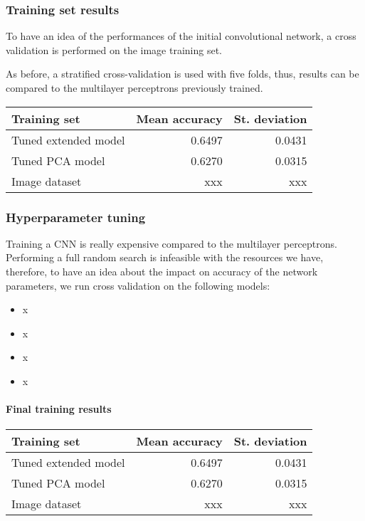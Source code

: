 \subsubsection{Training set results}
To have an idea of the performances of the initial convolutional network,
a cross validation is performed on the image training set. 

As before, a stratified cross-validation is used with five folds, thus, 
results can be compared to the multilayer perceptrons previously trained.
\begin{center}
    \begin{tabular}{ |l|r|r| } 
        \hline
        Training set & Mean accuracy & St. deviation \\
        \hline
        Tuned extended model& 0.6497 & 0.0431 \\
        Tuned PCA model & 0.6270 & 0.0315 \\
        Image dataset & xxx &  xxx \\
        \hline
    \end{tabular}
\end{center}

\subsubsection{Hyperparameter tuning}
Training a CNN is really expensive compared to the multilayer perceptrons.
Performing a full random search is infeasible with the resources we have, therefore, 
to have an idea about the impact on accuracy of the network parameters, 
we run cross validation on the following models:
\begin{itemize}
    \item x
    \item x
    \item x
    \item x
\end{itemize}

\paragraph{Final training results}
\begin{center}
    \begin{tabular}{ |l|r|r| } 
        \hline
        Training set & Mean accuracy & St. deviation \\
        \hline
        Tuned extended model& 0.6497 & 0.0431 \\
        Tuned PCA model & 0.6270 & 0.0315 \\
        Image dataset & xxx &  xxx \\
        \hline
    \end{tabular}
\end{center}

\newpage